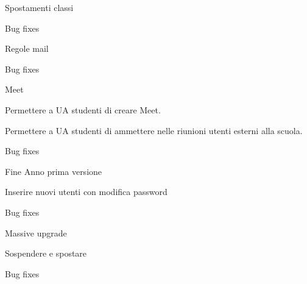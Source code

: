\begin{changelog}[author=JOHN DOE, sectioncmd=\chapter*]
	\begin{version}[v=1.0.4,
		date=2023-07-25]
		\added
		\item Spostamenti classi
		\fixed
		\item Bug fixes
	\end{version}
	\begin{version}[v=1.0.3,
		date=2023-07-25]
		\added
		\item Regole mail
		\fixed
		\item Bug fixes
	\end{version}
		\begin{version}[v=1.0.2,
		date=2023-07-21]
		\added
		\item Meet
		\item Permettere a  UA studenti di creare Meet.
		\item Permettere a UA studenti di ammettere nelle riunioni utenti esterni alla scuola.
		\fixed
		\item Bug fixes
	\end{version}
	\begin{version}[v=1.0.1,
		date=2023-07-17]
		\added
		\item Fine Anno prima versione
		\item Inserire nuovi utenti con modifica password
		\fixed
		\item Bug fixes
	\end{version}
	\begin{version}[v=1.0.0,
		date=2023-07-15]
		\added
		\item Massive upgrade
		\item Sospendere e spostare
		\fixed
		\item Bug fixes
	\end{version}
	\end{changelog}
	\listoftodos